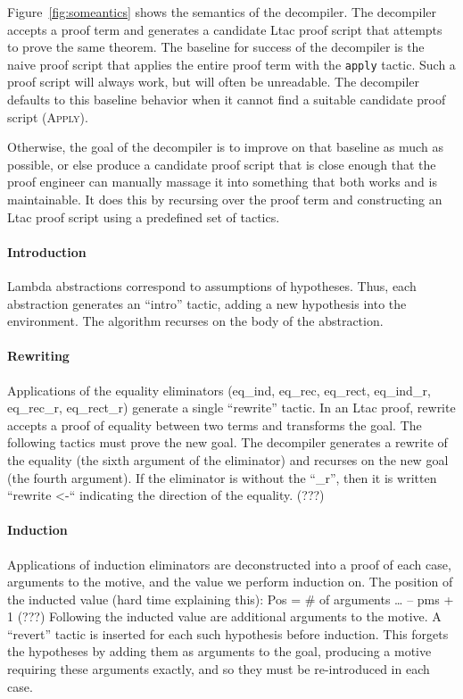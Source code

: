 Figure~\ref{fig:someantics} shows the semantics of the decompiler.
The decompiler accepts a proof term and generates a candidate Ltac proof script that attempts to prove the same theorem.
The baseline for success of the decompiler is the naive proof script that applies the entire proof term with the \lstinline{apply} tactic.
Such a proof script will always work, but will often be unreadable.
The decompiler defaults to this baseline behavior when it cannot find a suitable candidate proof script (\textsc{Apply}).

Otherwise, the goal of the decompiler is to improve on that baseline as much as possible,
or else produce a candidate proof script that is close enough that the proof engineer can manually massage it into something that
both works and is maintainable.
It does this by recursing over the proof term and constructing an Ltac proof script using a predefined set of tactics.

\paragraph{Introduction}
Lambda abstractions correspond to assumptions of hypotheses. Thus, each abstraction generates an “intro” tactic, adding a new hypothesis into the environment. The algorithm recurses on the body of the abstraction.

\paragraph{Rewriting}
Applications of the equality eliminators (eq_ind, eq_rec, eq_rect, eq_ind_r, eq_rec_r, eq_rect_r) generate a single “rewrite” tactic. In an Ltac proof, rewrite accepts a proof of equality between two terms and transforms the goal. The following tactics must prove the new goal. The decompiler generates a rewrite of the equality (the sixth argument of the eliminator) and recurses on the new goal (the fourth argument). If the eliminator is without the “_r”, then it is written “rewrite <-“ indicating the direction of the equality. (???)

\paragraph{Induction}
Applications of induction eliminators are deconstructed into a proof of each case, arguments to the motive, and the value we perform induction on.
The position of the inducted value (hard time explaining this): Pos = \# of arguments … – pms + 1 (???)
Following the inducted value are additional arguments to the motive. A “revert” tactic is inserted for each such hypothesis before induction. This forgets the hypotheses by adding them as arguments to the goal, producing a motive requiring these arguments exactly, and so they must be re-introduced in each case.

